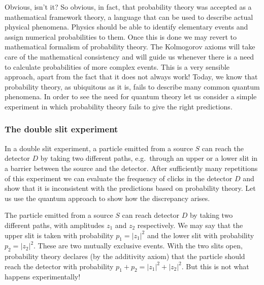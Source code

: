 \documentclass[fleqn]{article}
\begin{document}
Obvious, isn't it?
So obvious, in fact, that probability theory was accepted as a mathematical framework theory, a language that can be used to describe actual physical phenomena.
Physics should be able to identify elementary events and assign numerical probabilities to them.
Once this is done we may revert to mathematical formalism of probability theory.
The Kolmogorov axioms will take care of the mathematical consistency and will guide us whenever there is a need to calculate probabilities of more complex events.
This is a very sensible approach, apart from the fact that it does not always work!
Today, we know that probability theory, as ubiquitous as it is, fails to describe many common quantum phenomena.
In order to see the need for quantum theory let us consider a simple experiment in which probability theory fails to give the right predictions.

\hypertarget{the-double-slit-experiment}{%
\subsubsection{The double slit experiment}\label{the-double-slit-experiment}}

In a double slit experiment, a particle emitted from a source \(S\) can reach the detector \(D\) by taking two different paths, e.g.~through an upper or a lower slit in a barrier between the source and the detector.
After sufficiently many repetitions of this experiment we can evaluate the frequency of clicks in the detector \(D\) and show that it is inconsistent with the predictions based on probability theory.
Let us use the quantum approach to show how the discrepancy arises.

The particle emitted from a source \(S\) can reach detector \(D\) by taking two different paths, with amplitudes \(z_1\) and \(z_2\) respectively.
We may say that the upper slit is taken with probability \(p_1=|z_1|^2\) and the lower slit with probability \(p_2=|z_2|^2\).
These are two mutually exclusive events.
With the two slits open, probability theory declares (by the additivity axiom) that the particle should reach the detector with probability \(p_1+p_2= |z_1|^2+|z_2|^2\).
But this is not what happens experimentally!
\end{document}
